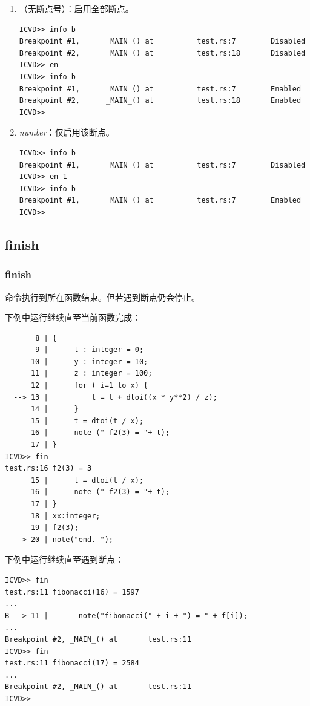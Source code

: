 \begin{enumerate}
  \item {}（无断点号）：启用全部断点。
\begin{lstlisting}
ICVD>> info b
Breakpoint #1,      _MAIN_() at          test.rs:7        Disabled
Breakpoint #2,      _MAIN_() at          test.rs:18       Disabled
ICVD>> en
ICVD>> info b
Breakpoint #1,      _MAIN_() at          test.rs:7        Enabled
Breakpoint #2,      _MAIN_() at          test.rs:18       Enabled
ICVD>>
\end{lstlisting}

  \item {} \textit{number}：仅启用该断点。
\begin{lstlisting}
ICVD>> info b
Breakpoint #1,      _MAIN_() at          test.rs:7        Disabled
ICVD>> en 1
ICVD>> info b
Breakpoint #1,      _MAIN_() at          test.rs:7        Enabled
ICVD>>
\end{lstlisting}
\end{enumerate}

\subsection{finish}
\subsubsection*{finish}

 命令执行到所在函数结束。但若遇到断点仍会停止。

下例中运行继续直至当前函数完成：
\begin{lstlisting}
       8 | {
       9 |      t : integer = 0;
      10 |      y : integer = 10;
      11 |      z : integer = 100;
      12 |      for ( i=1 to x) {
  --> 13 |          t = t + dtoi((x * y**2) / z);
      14 |      }
      15 |      t = dtoi(t / x);
      16 |      note (" f2(3) = "+ t);
      17 | }
ICVD>> fin
test.rs:16 f2(3) = 3
      15 |      t = dtoi(t / x);
      16 |      note (" f2(3) = "+ t);
      17 | }
      18 | xx:integer;
      19 | f2(3);
  --> 20 | note("end. ");
\end{lstlisting}

下例中运行继续直至遇到断点：
\begin{lstlisting}
ICVD>> fin
test.rs:11 fibonacci(16) = 1597
...
B --> 11 |       note("fibonacci(" + i + ") = " + f[i]);
...
Breakpoint #2, _MAIN_() at       test.rs:11
ICVD>> fin
test.rs:11 fibonacci(17) = 2584
...
Breakpoint #2, _MAIN_() at       test.rs:11
ICVD>>
\end{lstlisting}

